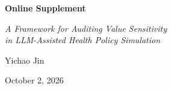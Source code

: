 \documentclass[12pt,a4paper]{article}
\begin{document}
\clearpage





\clearpage
\begingroup
\let\maketitle\relax
\begin{center}
\vspace*{2em}
{\Large\bfseries Online Supplement\par}
\vspace{2em}
{\large\itshape A Framework for Auditing Value Sensitivity\\
in LLM-Assisted Health Policy Simulation\par}
\vspace{2em}
{\large Yichao Jin\par}
\vspace{0.75em}
{\normalsize October 2, 2026\par}
\end{center}
\vspace{2.5em}
\makeatletter{}\makeatother

\endgroup
\end{document}

